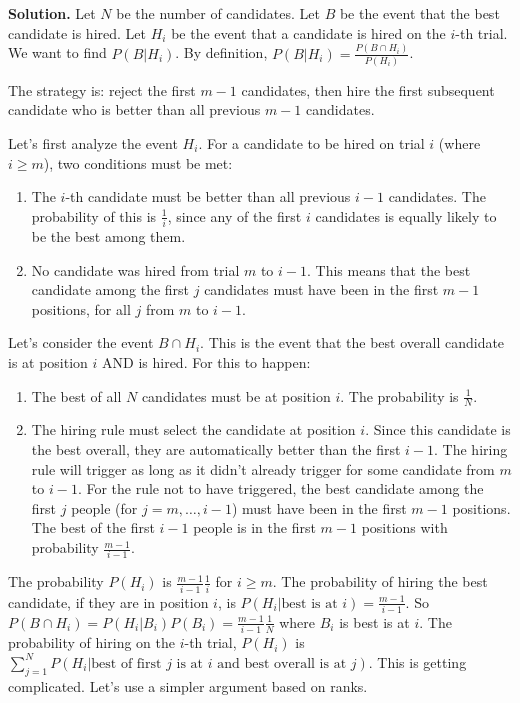 \noindent\textbf{Solution.}
Let $N$ be the number of candidates. Let $B$ be the event that the best candidate is hired. Let $H_i$ be the event that a candidate is hired on the $i$-th trial. We want to find $P(B|H_i)$.
By definition, $P(B|H_i) = \frac{P(B \cap H_i)}{P(H_i)}$.

The strategy is: reject the first $m-1$ candidates, then hire the first subsequent candidate who is better than all previous $m-1$ candidates.

Let's first analyze the event $H_i$. For a candidate to be hired on trial $i$ (where $i \ge m$), two conditions must be met:
\begin{enumerate}
    \item The $i$-th candidate must be better than all previous $i-1$ candidates. The probability of this is $\frac{1}{i}$, since any of the first $i$ candidates is equally likely to be the best among them.
    \item No candidate was hired from trial $m$ to $i-1$. This means that the best candidate among the first $j$ candidates must have been in the first $m-1$ positions, for all $j$ from $m$ to $i-1$.
\end{enumerate}
Let's consider the event $B \cap H_i$. This is the event that the best overall candidate is at position $i$ AND is hired. For this to happen:
\begin{enumerate}
    \item The best of all $N$ candidates must be at position $i$. The probability is $\frac{1}{N}$.
    \item The hiring rule must select the candidate at position $i$. Since this candidate is the best overall, they are automatically better than the first $i-1$. The hiring rule will trigger as long as it didn't already trigger for some candidate from $m$ to $i-1$. For the rule not to have triggered, the best candidate among the first $j$ people (for $j=m, \dots, i-1$) must have been in the first $m-1$ positions. The best of the first $i-1$ people is in the first $m-1$ positions with probability $\frac{m-1}{i-1}$.
\end{enumerate}
The probability $P(H_i)$ is $\frac{m-1}{i-1}\frac{1}{i}$ for $i\geq m$. The probability of hiring the best candidate, if they are in position $i$, is $P(H_i| \text{best is at } i) = \frac{m-1}{i-1}$.
So $P(B \cap H_i) = P(H_i | B_i)P(B_i) = \frac{m-1}{i-1}\frac{1}{N}$ where $B_i$ is best is at $i$.
The probability of hiring on the $i$-th trial, $P(H_i)$ is $\sum_{j=1}^N P(H_i | \text{best of first } j \text{ is at } i \text{ and best overall is at } j)$.
This is getting complicated. Let's use a simpler argument based on ranks.

